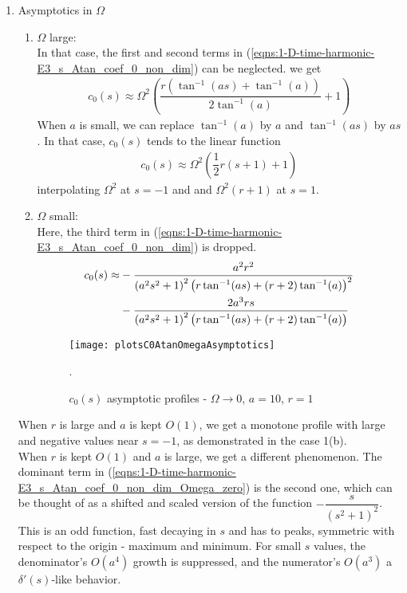 \documentclass[12pt,twoside]{article}
\begin{document}
\begin{enumerate}
\begin{enumerate}
\item Asymptotics in $\Omega$
	\begin{enumerate}
	\item $\Omega$ large:\\
	In that case, the first and second terms in (\ref{eqns:1-D-time-harmonic-E3_s_Atan_coef_0_non_dim}) can be neglected. we get
	\begin{align}
	c_0(s) \approx \Omega ^2 \left(\dfrac{r \left(\tan ^{-1}(a s)+\tan ^{-1}(a)\right)}{2 \tan ^{-1}(a)}+1\right)
	\end{align}
	When $a$ is small, we can replace $\tan^{-1}(a)$ by $a$ and $\tan^{-1}(as)$ by $as$. In that case, $c_0(s)$ tends to the linear function
	\begin{align}
	c_0(s) \approx \Omega ^2\left( \dfrac{1}{2} r (s+1) + 1 \right)
	\end{align}
	interpolating $\Omega^2$ at $s=-1$ and  and $\Omega^2(r+1)$ at $s=1$.
	
	\item $\Omega$ small:\\
	Here, the third term in (\ref{eqns:1-D-time-harmonic-E3_s_Atan_coef_0_non_dim}) is dropped. 
	\begin{align}
	\label{eqns:1-D-time-harmonic-E3_s_Atan_coef_0_non_dim_Omega_zero}
	c_0(s) \approx &-\dfrac{a^2 r^2}{\left(a^2 s^2+1\right)^2 \left(r \tan ^{-1}(a s)+(r+2)
   \tan ^{-1}(a)\right)^2} \notag \\
   &-\dfrac{2 a^3 r s}{\left(a^2 s^2+1\right)^2
   \left(r \tan ^{-1}(a s)+(r+2) \tan ^{-1}(a)\right)}
	\end{align}
	
\begin{figure} 
\begin{center}
\texttt{[image: plotsC0AtanOmegaAsymptotics]}
\end{center}
\caption {$c_0(s)$ asymptotic profiles - $\Omega \rightarrow 0$, $a = 10$, $r = 1$}.

\label{fig:c0AtanOmegalim}
\end{figure}


\end{enumerate}

	When $r$ is large and $a$ is kept $O(1)$, we get a monotone profile with large and negative values near $s=-1$, as demonstrated in the case 1(b). \\
	When $r$ is kept $O(1)$ and $a$ is large, we get a different phenomenon. The dominant term in (\ref{eqns:1-D-time-harmonic-E3_s_Atan_coef_0_non_dim_Omega_zero}) is the second one, which can be thought of as a shifted and scaled version of the function $-\dfrac{s}{(s^2 +1)^2}$. This is an odd function, fast decaying in $s$ and has to peaks, symmetric with respect to the origin - maximum and minimum. For small $s$ values, the denominator's $O(a^4)$ growth is suppressed, and the numerator's $O(a^3)$ a $\delta'(s)$-like behavior. 
	\end{enumerate}

\end{enumerate}
\end{document}

